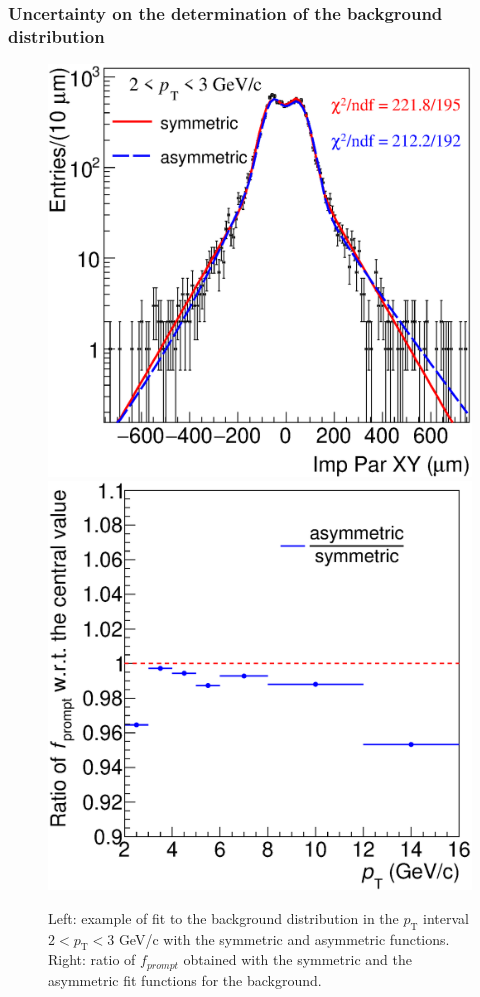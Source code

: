 \documentclass[b5paper,10pt,twoside,oldstyle,classica]{toptesi}
\newcommand{\pt}{p_\text{T}}
\begin{document}
\subsubsection{Uncertainty on the determination of the background distribution}
\begin{figure}[tb]
\begin{center}
{\includegraphics[scale = 0.32]{BkgFitFuncComp.eps}}
\hspace{-0.6cm}
{\includegraphics[scale = 0.32]{promptfraction_syst_prefit_onlyratio.eps}}
\caption{Left: example of fit to the background distribution in the $\pt$ interval $2<\pt<3$ GeV/c with the symmetric and asymmetric functions. Right: ratio of $f_{prompt}$ obtained with the symmetric and the asymmetric fit functions for the background.}
\label{bkgfitfunc_syst}
\end{center}
\end{figure} 
\end{document}
